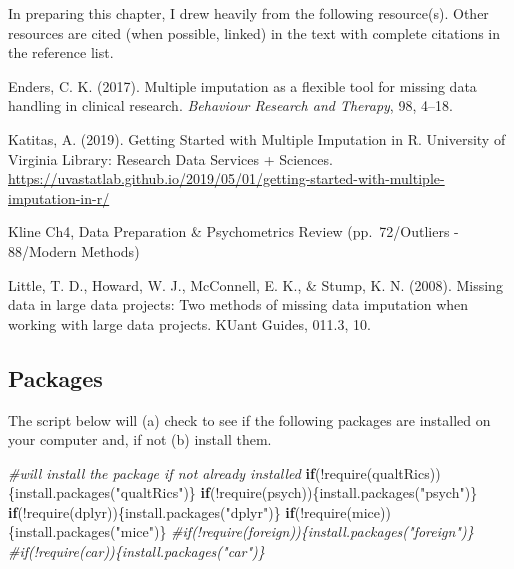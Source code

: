 \documentclass[
]{book}
\newenvironment{Shaded}{\begin{snugshade}}{\end{snugshade}}
\newcommand{\CommentTok}[1]{\textcolor[rgb]{0.56,0.35,0.01}{\textit{#1}}}
\newcommand{\ControlFlowTok}[1]{\textcolor[rgb]{0.13,0.29,0.53}{\textbf{#1}}}
\newcommand{\FunctionTok}[1]{\textcolor[rgb]{0.00,0.00,0.00}{#1}}
\newcommand{\NormalTok}[1]{#1}
\newcommand{\SpecialCharTok}[1]{\textcolor[rgb]{0.00,0.00,0.00}{#1}}
\newcommand{\StringTok}[1]{\textcolor[rgb]{0.31,0.60,0.02}{#1}}
\begin{document}
In preparing this chapter, I drew heavily from the following resource(s). Other resources are cited (when possible, linked) in the text with complete citations in the reference list.

Enders, C. K. (2017). Multiple imputation as a flexible tool for missing data handling in clinical research. \emph{Behaviour Research and Therapy}, 98, 4--18.

Katitas, A. (2019). Getting Started with Multiple Imputation in R. University of Virginia Library: Research Data Services + Sciences. \url{https://uvastatlab.github.io/2019/05/01/getting-started-with-multiple-imputation-in-r/}

Kline Ch4, Data Preparation \& Psychometrics Review (pp.~72/Outliers - 88/Modern Methods)

Little, T. D., Howard, W. J., McConnell, E. K., \& Stump, K. N. (2008). Missing data in large data projects: Two methods of missing data imputation when working with large data projects. KUant Guides, 011.3, 10.

\hypertarget{packages-4}{%
\subsection{Packages}\label{packages-4}}

The script below will (a) check to see if the following packages are installed on your computer and, if not (b) install them.

\begin{Shaded}
\begin{Highlighting}[]
\CommentTok{\#will install the package if not already installed}
\ControlFlowTok{if}\NormalTok{(}\SpecialCharTok{!}\FunctionTok{require}\NormalTok{(qualtRics))\{}\FunctionTok{install.packages}\NormalTok{(}\StringTok{"qualtRics"}\NormalTok{)\}}
\ControlFlowTok{if}\NormalTok{(}\SpecialCharTok{!}\FunctionTok{require}\NormalTok{(psych))\{}\FunctionTok{install.packages}\NormalTok{(}\StringTok{"psych"}\NormalTok{)\}}
\ControlFlowTok{if}\NormalTok{(}\SpecialCharTok{!}\FunctionTok{require}\NormalTok{(dplyr))\{}\FunctionTok{install.packages}\NormalTok{(}\StringTok{"dplyr"}\NormalTok{)\}}
\ControlFlowTok{if}\NormalTok{(}\SpecialCharTok{!}\FunctionTok{require}\NormalTok{(mice))\{}\FunctionTok{install.packages}\NormalTok{(}\StringTok{"mice"}\NormalTok{)\}}
\CommentTok{\#if(!require(foreign))\{install.packages("foreign")\}}
\CommentTok{\#if(!require(car))\{install.packages("car")\}}
\end{Highlighting}
\end{Shaded}
\end{document}
